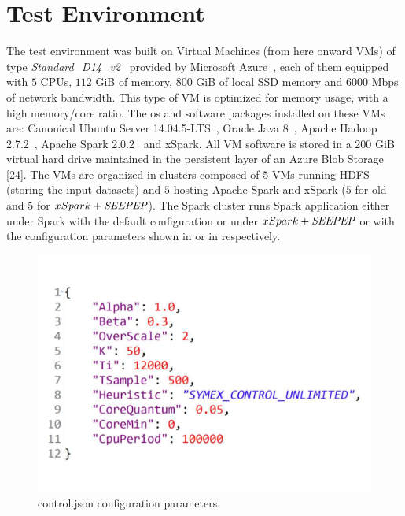 \section{Test Environment}\label{sec:test_env}
The test environment was built on Virtual Machines (from here onward VMs) of type   \textit{Standard\_D14\_v2}~\cite{AzureVMsizes}  provided by Microsoft Azure~\cite{AzureVM}, each of them equipped with $5$ CPUs, $112$ GiB of memory, $800$ GiB of local SSD memory and $6000$ Mbps of network bandwidth.
This type of VM is optimized for memory usage, with a high memory/core ratio. The os and software packages installed on these VMs are: Canonical Ubuntu Server 14.04.5-LTS~\cite{Ubuntu}, Oracle Java 8~\cite{Java8}, Apache Hadoop 2.7.2~\cite{Hadoop}, Apache Spark 2.0.2~\cite{Spark} and xSpark. All VM software is stored in a 200 GiB virtual hard drive maintained in the persistent layer of an Azure Blob Storage [24]. The VMs are organized in clusters composed of $5$ VMs running HDFS (storing the input datasets) and $5$ hosting Apache Spark and xSpark ($5$ for old \cSpark and $5$ for $xSpark+\textit{SEEPEP}$). The Spark cluster runs Spark application either under Spark with the default configuration or under  $xSpark+\textit{SEEPEP}$ or \cSpark with the configuration parameters shown in   or in  respectively.
\begin{figure}[thbp]
	\centering
	\includegraphics[width=\columnwidth]{images/xspark_symex_control_unlimited_parms.pdf}
	\caption{control.json \tool configuration parameters.}
	\label{fig:xSparkDagSymbConfigParms}
\end{figure}
